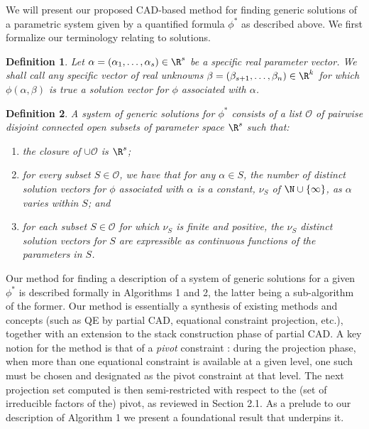 \documentclass{article}
\newtheorem{definition}{Definition}
\begin{document}
We will present our proposed CAD-based method 
for finding generic solutions of a parametric
system given by a quantified formula $\phi^*$ as described above.
We first formalize our terminology relating to solutions.
\begin{definition}
Let $\alpha = (\alpha_1, \ldots, \alpha_s) \in \R^s$ be a specific
real parameter vector. We shall call any specific vector of real
unknowns $\beta = (\beta_{s+1}, \ldots, \beta_n) \in \R^k$
for which $\phi(\alpha, \beta)$ is true a
{\em solution vector for $\phi$ associated with} $\alpha$.
\end{definition}
\begin{definition}
A {\em system of generic solutions} for $\phi^*$
consists of a list $\mathcal{O}$ of pairwise disjoint
connected open subsets of parameter space $\R^s$ such that:
\begin{enumerate}
 \item the closure of $\cup \mathcal{O}$ is $\R^s$;
 \item for every subset $S \in \mathcal{O}$, we have that for any $\alpha \in S$, the number of distinct solution vectors for $\phi$ associated
    with $\alpha$ is a constant, $\nu_S$ of 
    $\N \cup \{\infty\}$, as $\alpha$ varies within $S$; and
  \item for each subset $S \in \mathcal{O}$ for which $\nu_S$ is finite
    and positive, the $\nu_S$ distinct solution vectors for $S$ 
    are expressible as continuous functions of the parameters in $S$.
\end{enumerate}
\end{definition}


Our method for finding a description of a system of generic
solutions for a given $\phi^*$ is described formally 
in Algorithms 1 and 2, the latter being a sub-algorithm of the former. 
Our method is essentially a synthesis of existing methods and concepts
(such as QE by partial CAD, equational constraint projection, etc.),
together with an extension to the stack construction phase of partial CAD.
A key notion for the method is that of a {\em pivot} constraint
\cite{Collins1998}:
during the projection phase, when more than one equational constraint
is available at a given level, one such must be chosen and designated
as the pivot constraint at that level.
The next projection set computed is then semi-restricted with respect to
the (set of irreducible factors of the) pivot, as reviewed in Section 2.1.
As a prelude to our description of Algorithm 1 we present a foundational
result that underpins it.
\end{document}

